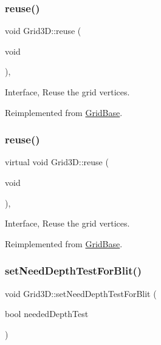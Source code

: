 \subsubsection{\texorpdfstring{reuse()}{reuse()}\hspace{0.1cm}{\footnotesize\ttfamily [1/2]}}
{\footnotesize\ttfamily void Grid3\+D\+::reuse (\begin{DoxyParamCaption}\item[{void}]{ }\end{DoxyParamCaption})\hspace{0.3cm}{\ttfamily [override]}, {\ttfamily [virtual]}}

Interface, Reuse the grid vertices. 

Reimplemented from \hyperlink{classGridBase_a3567fe2ec6ea038325944d49a7bde37d}{Grid\+Base}.

\mbox{\label{classGrid3D_a0a191279a3bb479d5d85a58c78685865}} 
\subsubsection{\texorpdfstring{reuse()}{reuse()}\hspace{0.1cm}{\footnotesize\ttfamily [2/2]}}
{\footnotesize\ttfamily virtual void Grid3\+D\+::reuse (\begin{DoxyParamCaption}\item[{void}]{ }\end{DoxyParamCaption})\hspace{0.3cm}{\ttfamily [override]}, {\ttfamily [virtual]}}

Interface, Reuse the grid vertices. 

Reimplemented from \hyperlink{classGridBase_a3567fe2ec6ea038325944d49a7bde37d}{Grid\+Base}.

\mbox{\label{classGrid3D_a6d2d00afb35013a206d85b5cd298f781}} 
\subsubsection{\texorpdfstring{set\+Need\+Depth\+Test\+For\+Blit()}{setNeedDepthTestForBlit()}\hspace{0.1cm}{\footnotesize\ttfamily [1/2]}}
{\footnotesize\ttfamily void Grid3\+D\+::set\+Need\+Depth\+Test\+For\+Blit (\begin{DoxyParamCaption}\item[{bool}]{needed\+Depth\+Test }\end{DoxyParamCaption})\hspace{0.3cm}{\ttfamily [inline]}}


